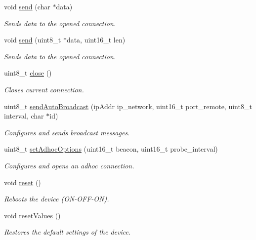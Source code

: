 \begin{DoxyCompactItemize}
void \hyperlink{class_wasp_w_i_f_i_a3cb096c2dd9b0d8c7a443d7213da0845}{send} (char $\ast$data)
\begin{DoxyCompactList}\small\item\em Sends data to the opened connection. \end{DoxyCompactList}\item 
void \hyperlink{class_wasp_w_i_f_i_a6c7e6260ebb008a2264e1f550f36e59f}{send} (uint8\+\_\+t $\ast$data, uint16\+\_\+t len)
\begin{DoxyCompactList}\small\item\em Sends data to the opened connection. \end{DoxyCompactList}\item 
uint8\+\_\+t \hyperlink{class_wasp_w_i_f_i_a819ae8911c006c5948f6b48396879630}{close} ()
\begin{DoxyCompactList}\small\item\em Closes current connection. \end{DoxyCompactList}\item 
uint8\+\_\+t \hyperlink{class_wasp_w_i_f_i_a0c3e4f3abcc870b4f425a1199df188d0}{send\+Auto\+Broadcast} (ip\+Addr ip\+\_\+network, uint16\+\_\+t port\+\_\+remote, uint8\+\_\+t interval, char $\ast$id)
\begin{DoxyCompactList}\small\item\em Configures and sends broadcast messages. \end{DoxyCompactList}\item 
uint8\+\_\+t \hyperlink{class_wasp_w_i_f_i_ae752cf2acecef466f9dd35032cbd21ee}{set\+Adhoc\+Options} (uint16\+\_\+t beacon, uint16\+\_\+t probe\+\_\+interval)
\begin{DoxyCompactList}\small\item\em Configures and opens an adhoc connection. \end{DoxyCompactList}\item 
void \hyperlink{class_wasp_w_i_f_i_adcaf4dd23b30c19eefca8d6b4458ab02}{reset} ()
\begin{DoxyCompactList}\small\item\em Reboots the device (O\+N-\/\+O\+F\+F-\/\+ON). \end{DoxyCompactList}\item 
void \hyperlink{class_wasp_w_i_f_i_a5069b888855806680db6ffbaea857581}{reset\+Values} ()
\begin{DoxyCompactList}\small\item\em Restores the default settings of the device. \end{DoxyCompactList}\item 

\end{DoxyCompactItemize}
